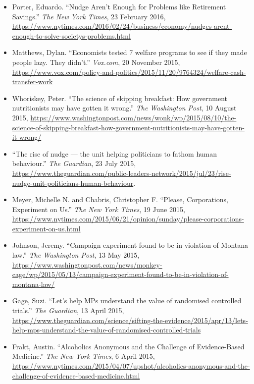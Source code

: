 \documentclass[12pt,a4paper]{article}
\begin{document}
\begin{itemize}
\item Porter, Eduardo. ``Nudge Aren't Enough for Problems like Retirement Savings.'' \textit{The New York Times}, 23 February 2016, \url{https://www.nytimes.com/2016/02/24/business/economy/nudges-arent-enough-to-solve-societys-problems.html}

\item Matthews, Dylan. ``Economists tested 7 welfare programs to see if they made people lazy. They didn't.'' \textit{Vox.com}, 20 November 2015, \url{https://www.vox.com/policy-and-politics/2015/11/20/9764324/welfare-cash-transfer-work}

\item Whoriskey, Peter. ``The science of skipping breakfast: How government nutritionists may have gotten it wrong.'' \textit{The Washington Post}, 10 August 2015, \url{https://www.washingtonpost.com/news/wonk/wp/2015/08/10/the-science-of-skipping-breakfast-how-government-nutritionists-may-have-gotten-it-wrong/}

\item ``The rise of nudge --- the unit helping politicians to fathom human behaviour.'' \textit{The Guardian}, 23 July 2015, \url{https://www.theguardian.com/public-leaders-network/2015/jul/23/rise-nudge-unit-politicians-human-behaviour}.

\item Meyer, Michelle N. and Chabris, Christopher F. ``Please, Corporations, Experiment on Us.'' \textit{The New York Times}, 19 June 2015, \url{https://www.nytimes.com/2015/06/21/opinion/sunday/please-corporations-experiment-on-us.html}

\item Johnson, Jeremy. ``Campaign experiment found to be in violation of Montana law.'' \textit{The Washington Post}, 13 May 2015, \url{https://www.washingtonpost.com/news/monkey-cage/wp/2015/05/13/campaign-experiment-found-to-be-in-violation-of-montana-law/}

\item Gage, Suzi. ``Let's help MPs understand the value of randomised controlled trials.'' \textit{The Guardian}, 13 April 2015, \url{https://www.theguardian.com/science/sifting-the-evidence/2015/apr/13/lets-help-mps-understand-the-value-of-randomised-controlled-trials}

\item Frakt, Austin. ``Alcoholics Anonymous and the Challenge of Evidence-Based Medicine.'' \textit{The New York Times}, 6 April 2015, \url{https://www.nytimes.com/2015/04/07/upshot/alcoholics-anonymous-and-the-challenge-of-evidence-based-medicine.html}


\end{itemize}
\end{document}
